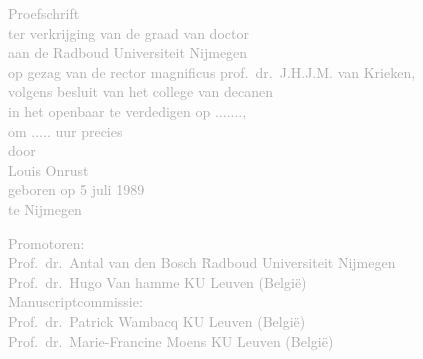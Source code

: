 \makeatletter



\begin{titlepage}\thispagestyle{empty}
    \sffamily%
    \begin{fullwidth}%
        \fontsize{36}{40}\selectfont\par\noindent\textcolor{darkgray}{\allcaps{\thanklesstitle}}%
        \vfill%
        \fontsize{18}{20}\selectfont\par\noindent\textcolor{darkgray}{\centering%
        Proefschrift \\[2em] ter verkrijging van de graad van doctor\\
        aan de Radboud Universiteit Nijmegen\\
        op gezag van de rector magnificus prof.~dr.~J.H.J.M. van Krieken,\\
        volgens besluit van het college van decanen \\
        in het openbaar te verdedigen op ......., \\
        om ..... uur precies \\[2em]
        \vfill%
        door \\
        Louis Onrust \\
        geboren op 5 juli 1989 \\
        te Nijmegen \\
        }%
        \newpage\thispagestyle{empty}
        \vspace{1.7cm}%
        \fontsize{18}{20}\selectfont\par\noindent\textcolor{darkgray}{%
        \begin{tabbing}
        Promotoren: \\[1.5em]
  		Prof.~dr.~Antal van den Bosch \qquad\= Radboud Universiteit Nijmegen\\
  		Prof.~dr.~Hugo Van hamme \>KU Leuven (Belgi\"e) \\[2em]
        \noindent Manuscriptcommissie: \\[1.5em]
  		Prof.~dr.~Patrick Wambacq \> KU Leuven (Belgi\"e)\\
  		Prof.~dr.~Marie-Francine Moens \>KU Leuven (Belgi\"e)
		\end{tabbing}
        }%
    \end{fullwidth}%
\end{titlepage}

